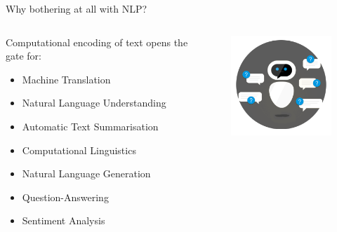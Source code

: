 \documentclass[9pt]{beamer}
\begin{document}
\begin{frame}{Why bothering at all with NLP?}
\begin{columns}[onlytextwidth]
    \begin{column}{0.50\textwidth}
    Computational encoding of text opens the gate for:
    \begin{itemize}
        \item Machine Translation
        \item Natural Language Understanding
        \item Automatic Text Summarisation
        \item Computational Linguistics
        \item Natural Language Generation
        \item Question-Answering
        \item Sentiment Analysis
    \end{itemize}
    \end{column}
    \begin{column}{0.50\textwidth}
        \begin{figure}
            \centering
            \includegraphics[width = 5cm]{img/question_answering.png}
        \end{figure}
    \end{column}
\end{columns}
\end{frame}
\end{document}
